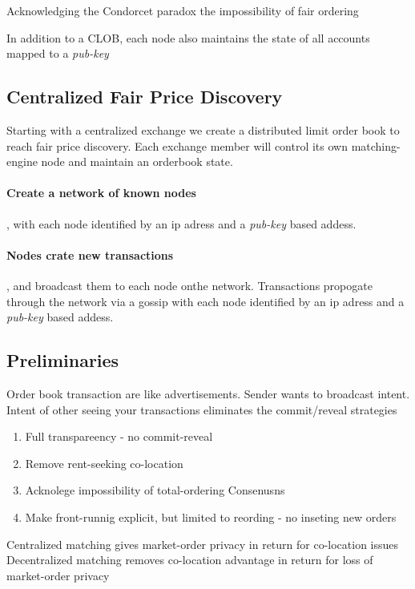 \documentclass[12pt]{article}
\begin{document}
Acknowledging the Condorcet paradox the impossibility of fair ordering \cite{Kelkar_2020} 



In addition to a CLOB, each node also maintains the state of all accounts mapped to a \emph{pub-key} 

\subsection{Centralized Fair Price Discovery}
Starting with a centralized exchange we create a distributed limit order book to reach fair price discovery. Each exchange member will control its own matching-engine node and maintain an orderbook state.       

\paragraph*{Create a network of known nodes}, with each node identified by an ip adress and a \emph{pub-key} based addess.     

\paragraph*{Nodes crate new transactions}, and broadcast them to each node onthe network. Transactions propogate through the network via a gossip   with each node identified by an ip adress and a \emph{pub-key} based addess.     


\subsection{Preliminaries}
Order book transaction are like advertisements. Sender wants to broadcast intent. Intent of other seeing your transactions eliminates the commit/reveal strategies 

\begin{enumerate}
    \item Full transpareency - no commit-reveal 
    \item Remove rent-seeking co-location 
    \item Acknolege impossibility of total-ordering Consenusns
    \item Make front-runnig explicit, but limited to reording - no inseting new orders 
\end{enumerate}

Centralized matching gives market-order privacy in return for co-location issues 
Decentralized matching removes co-location advantage in return for loss of market-order privacy 
\end{document}
